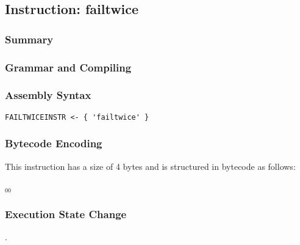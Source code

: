 \subsection{Instruction: failtwice}

\subsubsection{Summary}


\subsubsection{Grammar and Compiling}


\subsubsection{Assembly Syntax}

\begin{myquote}
\begin{verbatim}
FAILTWICEINSTR <- { 'failtwice' }
\end{verbatim}
\end{myquote}


\subsubsection{Bytecode Encoding}

This instruction has a size of 4 bytes and is structured in bytecode as follows:

$_{00}$\ 


\subsubsection{Execution State Change}

.


